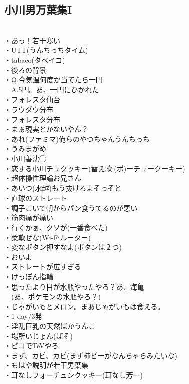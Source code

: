 \subsection{小川男万葉集I} 
　\\
・あっ！若干寒い\\
・UTT(うんちっちタイム)\\
・tabaco(タベイコ)\\
・後ろの背景\\
・Q.今気温何度か当てたら一円\\
　A.5円。あ、一円にひかれた\\
・フォレスタ仙台\\
・ラウダウ分布\\
・フォレスタ分布\\
・まぁ現実とかないやん？\\
・あれ(ファミマ)俺らのやつちゃんうんちっち\\
・うみまがめ\\
・小川善沈◯\\
・恋する小川チュクッキー(替え歌:(ポ)ーチュークーキー)\\
・超体操性理論お兄さん\\
・あいつ(水越)もう抜けろよそっそと\\
・直球のストレート\\
・調子こいて朝からパン食うてるのが悪い\\
・筋肉痛が痛い\\
・行くかぁ、クソが(一番食べた)\\
・柔軟せな(Wi-Fiルーター)\\
・変なボタン押すなよ(ボタンは２つ)\\
・おいよ\\
・ストレートが広すぎる\\
・けっぽん指輪\\
・思ったより目が水瓶やったやろ？あ、海亀\\
　(あ、ポケモンの水瓶やろ？)\\
・じゃがいもとメロン。まあじゃがいもは食える。\\
・1 day/3発\\
・淫乱巨乳の天然ばかうんこ\\
・場所いじょん(ばそ)\\
・ピコでTeVやろ\\
・まず、カピ、カピ(まず柿ピーがなんちゃらみたいな)\\
・もはや説明が若干男葉集\\
・耳なしフォーチュンクッキー(耳なし芳一)\\
